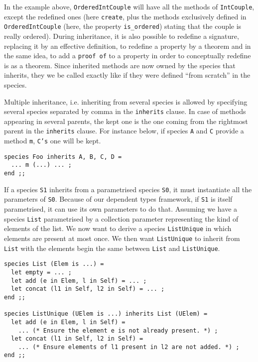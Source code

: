In the example above, {\tt OrderedIntCouple} will have all the methods
of {\tt IntCouple}, except the redefined ones (here {\tt create}, plus
the methods exclusively defined in {\tt OrderedIntCouple} (here, the
property {\tt is\_ordered}) stating that the couple is really
ordered). During inheritance, it is also possible to redefine a
signature, replacing it by an effective definition, to redefine a
property by a theorem and in the same idea, to add a {\tt proof of} to
a property in order to conceptually redefine is as a theorem. Since
inherited methods are now owned by the species that inherits, they we
be called exactly like if they were defined ``from scratch'' in the
species.

\smallskip
{}
Multiple inheritance, i.e. inheriting from several species is
allowed by specifying several species separated by comma in the
{\tt inherits} clause. In case of methods appearing in several
parents, the kept one is the one coming from the rightmost parent in
the {\tt inherits} clause. For instance below, if species {\tt A} and
{\tt C} provide a method {\tt m}, {\tt C's} one will be kept.
{\scriptsize
\begin{lstlisting}
species Foo inherits A, B, C, D =
  ... m (...) ... ;
end ;;
\end{lstlisting}
}

\smallskip
{}
If a species {\tt S1} inherits from a parametrised species {\tt S0},
it must instantiate all the parameters of {\tt S0}. Because of our
dependent types framework, if {\tt S1} is itself
parametrised, it can use its own parameters to do that. Assuming we
have a species {\tt List} parametrised by a collection parameter
representing the kind of elements of the list. We now want to derive
a species {\tt ListUnique} in which elements are present at most
once. We then want {\tt ListUnique} to inherit from {\tt List} with
the elements begin the same between {\tt List} and {\tt ListUnique}.
{\scriptsize
\begin{lstlisting}
species List (Elem is ...) =
  let empty = ... ;
  let add (e in Elem, l in Self) = ... ;
  let concat (l1 in Self, l2 in Self) = ... ;
end ;;

species ListUnique (UElem is ...) inherits List (UElem) =
  let add (e in Elem, l in Self) =
    ... (* Ensure the element e is not already present. *) ;
  let concat (l1 in Self, l2 in Self) =
    ... (* Ensure elements of l1 present in l2 are not added. *) ;
end ;;
\end{lstlisting}
}

